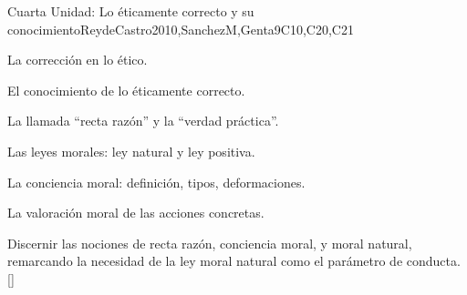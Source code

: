 \begin{syllabus}
\begin{unit}{}{Cuarta Unidad: Lo éticamente correcto y su conocimiento}{ReydeCastro2010,SanchezM,Genta}{9}{C10,C20,C21}
\begin{topics}
    \item La corrección en lo ético.
    \item El conocimiento de lo éticamente correcto.
    \item La llamada ``recta razón'' y la ``verdad práctica''.
    \item Las leyes morales: ley natural y ley positiva.
    \item La conciencia moral: definición, tipos, deformaciones.
    \item La valoración moral de las acciones concretas.
\end{topics}

\begin{learningoutcomes}
	\item Discernir las nociones de recta razón, conciencia moral, y moral natural, remarcando la necesidad de la ley moral natural como el parámetro de conducta.[\Familiarity]
\end{learningoutcomes}
\end{unit}



\begin{coursebibliography}
\end{coursebibliography}

\end{syllabus}
